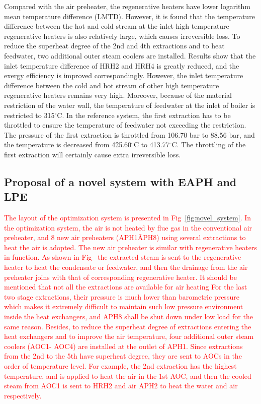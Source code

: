 \documentclass[preprint,12pt]{elsarticle}
\begin{document}
Compared with the air preheater, the regenerative heaters have lower logarithm mean temperature difference (LMTD).
However, it is found that the temperature difference between the hot and cold stream at the inlet high temperature regenerative heaters is also relatively large, which causes irreversible loss. To reduce the superheat degree of the 2nd and 4th extractions and to heat feedwater, two additional outer steam coolers are installed.
Results show that the inlet temperature difference of HRH2 and HRH4 is greatly reduced, and the exergy efficiency is improved correspondingly.
However, the inlet temperature difference between the cold and hot stream of other high temperature regenerative heaters remains very high.
Moreover, because of the material restriction of the water wall, the temperature of feedwater at the inlet of boiler is restricted to 315$^\circ$C. 
In the reference system, the first extraction has to be throttled to ensure the temperature of feedwater not exceeding the restriction.
The pressure of the first extraction is throttled from 106.70 bar to 88.56 bar, and the temperature is decreased from 425.60$^\circ$C to 413.77$^\circ$C. The throttling of the first extraction will certainly cause extra irreversible loss.
\subsection{Proposal of a novel system with EAPH and LPE}
\label{sub2:prop novel sys}
\textcolor{red}{The  layout of the optimization system is presented in Fig~\ref{fig:novel_system}.
In the optimization system, the air is not heated by flue gas in the conventional air preheater, and 8 new air preheaters (APH1\~APH8) using several extractions to heat the air is adopted.
The new air preheater is similar with regenerative heaters in function.
As shown in Fig~ the extracted steam is sent to the regenerative heater to heat the condensate or feedwater, and then the drainage from the air preheater joins with that of corresponding regenerative heater.
It should be mentioned that not all the extractions are available for air heating
For the last two stage extractions, their pressure is much lower than barometric pressure which makes it extremely difficult to maintain such low pressure environment inside the heat exchangers, and APH8 shall be shut down under low load for the same reason.
Besides, to reduce the superheat degree of extractions entering the heat exchangers and to improve the air temperature, four additional outer steam coolers (AOC1- AOC4) are installed at the outlet of APH1.
Since extractions from the 2nd to the 5th have superheat degree, they are sent to AOCs in the order of temperature level.
For example, the 2nd extraction has the highest temperature, and is applied to heat the air in the 1st AOC, and then the cooled steam from AOC1 is sent to HRH2 and air APH2 to heat the water and air respectively. }   
\end{document}
